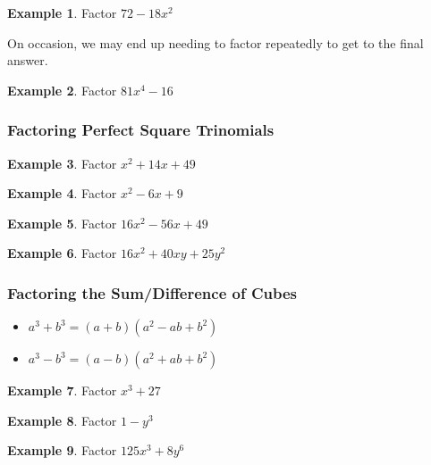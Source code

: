 \documentclass[addpoints,12pt]{exam}
\theoremstyle{definition}
\theoremstyle{break}
\theoremstyle{break}
\newtheorem{example}{Example}[subsection]
\begin{document}
\begin{example}
Factor $72 - 18x^2$
\vspace{1in}
\end{example}

\noindent On occasion, we may end up needing to factor repeatedly to get to the final answer.
\vspace{.15in}

\begin{example}
Factor $81x^4 - 16$
\end{example}

\newpage

\subsubsection*{Factoring Perfect Square Trinomials}
\begin{example}
Factor $x^2 + 14x + 49$
\vspace{1.5in}
\end{example}

\begin{example}
Factor $x^2 -6x + 9$
\vspace{1.5in}
\end{example}

\begin{example}
Factor $16x^2 - 56x + 49$
\vspace{1.5in}
\end{example}

\begin{example}
Factor $16x^2 + 40xy + 25y^2$
\vspace{1.5in}
\end{example}

\subsubsection*{Factoring the Sum/Difference of Cubes}
\begin{itemize}
\item $a^3 + b^3 = (a+b)(a^2 - ab + b^2)$
\item $a^3 - b^3 = (a-b)(a^2 + ab + b^2)$
\end{itemize}
\vspace{.15in}

\begin{example}
Factor $x^3 + 27$
\vspace{1.5in}
\end{example}

\begin{example}
Factor $1 - y^3$
\vspace{1.5in}
\end{example}

\begin{example}
Factor $125x^3 + 8y^6$
\end{example}
\end{document}
